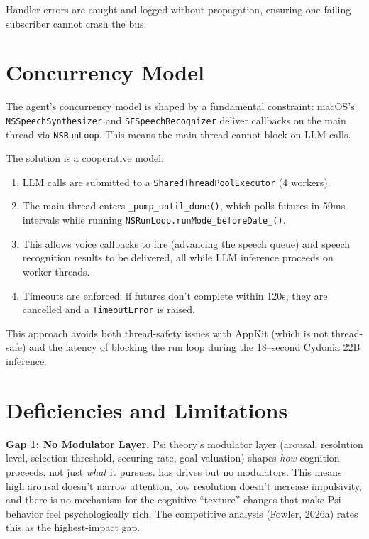 \documentclass[11pt,oneside]{article}
\begin{document}
Handler errors are caught and logged without propagation, ensuring one failing subscriber cannot crash the bus.


\section{Concurrency Model}
\label{sec:concurrency}

The agent's concurrency model is shaped by a fundamental constraint: macOS's \texttt{NSSpeechSynthesizer} and \texttt{SFSpeechRecognizer} deliver callbacks on the main thread via \texttt{NSRunLoop}.
This means the main thread cannot block on LLM calls.

The solution is a cooperative model:

\begin{enumerate}
  \item LLM calls are submitted to a \texttt{SharedThreadPoolExecutor} (4 workers).
  \item The main thread enters \texttt{\_pump\_until\_done()}, which polls futures in 50ms intervals while running \texttt{NSRunLoop.runMode\_beforeDate\_()}.
  \item This allows voice callbacks to fire (advancing the speech queue) and speech recognition results to be delivered, all while LLM inference proceeds on worker threads.
  \item Timeouts are enforced: if futures don't complete within 120s, they are cancelled and a \texttt{TimeoutError} is raised.
\end{enumerate}

This approach avoids both thread-safety issues with AppKit (which is not thread-safe) and the latency of blocking the run loop during the 18--second Cydonia 22B inference.


\section{Deficiencies and Limitations}
\label{sec:deficiencies}

\begin{gapbox}
\textbf{Gap 1: No Modulator Layer.}
Psi theory's modulator layer (arousal, resolution level, selection threshold, securing rate, goal valuation) shapes \emph{how} cognition proceeds, not just \emph{what} it pursues.
\sociopsi{} has drives but no modulators.
This means high arousal doesn't narrow attention, low resolution doesn't increase impulsivity, and there is no mechanism for the cognitive ``texture'' changes that make Psi behavior feel psychologically rich.
The competitive analysis (Fowler, 2026a) rates this as the highest-impact gap.
\end{gapbox}
\end{document}
